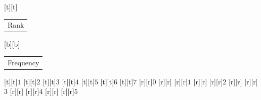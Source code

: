 %    
%
%
\begin{psfrags}%
\psfragscanon%
%
[t][t]{\color[rgb]{0,0,0}\setlength{\tabcolsep}{0pt}\begin{tabular}{c}\Large{}Rank\end{tabular}}%
[b][b]{\color[rgb]{0,0,0}\setlength{\tabcolsep}{0pt}\begin{tabular}{c}\Large{}Frequency\end{tabular}}%
%
[t][t]{$1$}%
[t][t]{$2$}%
[t][t]{$3$}%
[t][t]{$4$}%
[t][t]{$5$}%
[t][t]{$6$}%
[t][t]{$7$}%
%
[r][r]{$0$}%
[r][r]{}%
[r][r]{$1$}%
[r][r]{}%
[r][r]{$2$}%
[r][r]{}%
[r][r]{$3$}%
[r][r]{}%
[r][r]{$4$}%
[r][r]{}%
[r][r]{$5$}%
%
%
\end{psfrags}%
%
